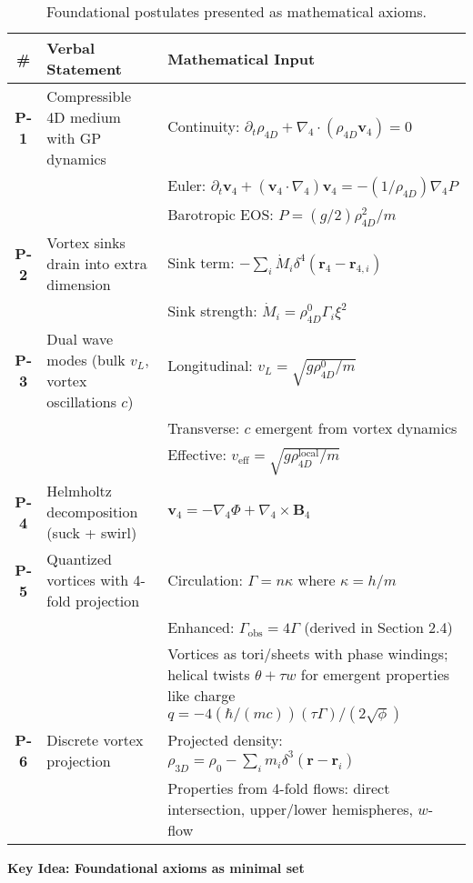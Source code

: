 \begin{table}[H]
\centering
\begin{tabularx}{\textwidth}{|c|Y|Y|}
\hline
\# & Verbal Statement & Mathematical Input \\
\hline
\textbf{P-1} & Compressible 4D medium with GP dynamics & Continuity: $\partial_t \rho_{4D} + \nabla_4 \cdot (\rho_{4D} \mathbf{v}_4) = 0$ \\
& & Euler: $\partial_t \mathbf{v}_4 + (\mathbf{v}_4 \cdot \nabla_4) \mathbf{v}_4 = -(1/\rho_{4D}) \nabla_4 P$ \\
& & Barotropic EOS: $P = (g/2) \rho_{4D}^2 / m$ \\
\hline
\textbf{P-2} & Vortex sinks drain into extra dimension & Sink term: $-\sum_i \dot{M}_i \delta^4(\mathbf{r}_4 - \mathbf{r}_{4,i})$ \\
& & Sink strength: $\dot{M}_i = \rho_{4D}^0 \Gamma_i \xi^2$ \\
\hline
\textbf{P-3} & Dual wave modes (bulk $v_L$, vortex oscillations $c$) & Longitudinal: $v_L = \sqrt{g \rho_{4D}^0 / m}$ \\
& & Transverse: $c$ emergent from vortex dynamics \\
& & Effective: $v_{\text{eff}} = \sqrt{g \rho_{4D}^{\text{local}} / m}$ \\
\hline
\textbf{P-4} & Helmholtz decomposition (suck + swirl) & $\mathbf{v}_4 = -\nabla_4 \Phi + \nabla_4 \times \mathbf{B}_4$ \\
\hline
\textbf{P-5} & Quantized vortices with 4-fold projection & Circulation: $\Gamma = n \kappa$ where $\kappa = h / m$ \\
& & Enhanced: $\Gamma_{\text{obs}} = 4 \Gamma$ (derived in Section 2.4) \\
& & Vortices as tori/sheets with phase windings; helical twists $\theta + \tau w$ for emergent properties like charge $q = -4 (\hbar / (m c)) (\tau \Gamma) / (2 \sqrt{\phi})$ \\
\hline
\textbf{P-6} & Discrete vortex projection & Projected density: $\rho_{3D} = \rho_0 - \sum_i m_i \delta^3(\mathbf{r} - \mathbf{r}_i)$ \\
& & Properties from 4-fold flows: direct intersection, upper/lower hemispheres, $w$-flow \\
\hline
\end{tabularx}
\caption{Foundational postulates presented as mathematical axioms.}
\label{tab:postulates}
\end{table}

\textbf{Key Idea: Foundational axioms as minimal set}

